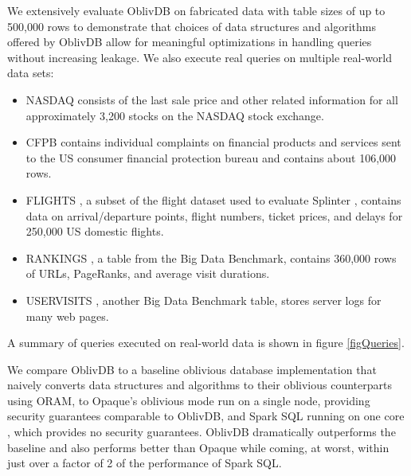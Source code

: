 \documentclass[conference]{IEEEtran}
\def\name/{OblivDB}
\begin{document}
We extensively evaluate \name/ on fabricated data with table sizes of up to 500,000 rows to demonstrate that choices of data structures and algorithms offered by \name/ allow for meaningful optimizations in handling queries without increasing leakage. We also execute real queries on multiple real-world data sets: 
\begin{itemize}
\item NASDAQ \cite{NASDAQ} consists of the last sale price and other related information for all approximately 3,200 stocks on the NASDAQ stock exchange.

\item CFPB \cite{CFPB} contains individual complaints on financial products and services sent to the US consumer financial protection bureau and contains about 106,000 rows.

\item FLIGHTS \cite{FLIGHT}, a subset of the flight dataset used to evaluate Splinter \cite{WYG+17}, contains data on arrival/departure points, flight numbers, ticket prices, and delays for 250,000 US domestic flights.

\item RANKINGS \cite{BDB}, a table from the Big Data Benchmark, contains 360,000 rows of URLs, PageRanks, and average visit durations.

\item USERVISITS \cite{BDB}, another Big Data Benchmark table, stores server logs for many web pages. 
\end{itemize}
A summary of queries executed on real-world data is shown in figure \ref{figQueries}. 

We compare \name/ to a baseline oblivious database implementation that naively converts data structures and algorithms to their oblivious counterparts using ORAM, to Opaque's oblivious mode \cite{ZDB+17} run on a single node, providing security guarantees comparable to \name/, and Spark SQL running on one core \cite{SparkSQL}, which provides no security guarantees. \name/ dramatically outperforms the baseline and also performs better than Opaque while coming, at worst, within just over a factor of 2 of the performance of Spark SQL. 
\end{document}
